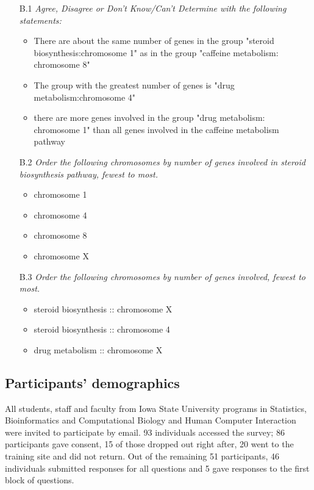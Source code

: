 \begin{itemize}
\item[B.1]\emph{Agree, Disagree or Don't Know/Can't Determine with the following statements:}
\begin{itemize}
\item There are about the same number of genes in the group "steroid biosynthesis:chromosome 1" as in the group "caffeine metabolism: chromosome 8"
\item The group with the greatest number of genes is "drug metabolism:chromosome 4"
\item there are more genes involved in the group "drug metabolism: chromosome 1" than all genes involved in the caffeine metabolism pathway
\end{itemize}

\item[B.2]\emph{Order the following chromosomes by number of genes involved in steroid biosynthesis pathway, fewest to most.}
\begin{itemize}
\item chromosome 1
\item chromosome 4
\item chromosome 8 
\item chromosome X
\end{itemize}

\item[B.3]\emph{Order the following chromosomes by number of genes involved, fewest to most.}
\begin{itemize}
\item steroid biosynthesis :: chromosome X
\item steroid biosynthesis :: chromosome 4
\item drug metabolism :: chromosome X
\end{itemize} 
\end{itemize} 


\subsection*{Participants' demographics}
All students, staff and faculty from Iowa State University programs in Statistics, Bioinformatics and Computational Biology and Human Computer Interaction were invited to participate by email. 93 individuals accessed the survey;
86 participants gave consent, 15  of those dropped out right after, 20 went to the training site and did not return.
Out of the remaining 51 participants, 46  individuals submitted responses for all questions and 5 gave responses to the first block of questions.

